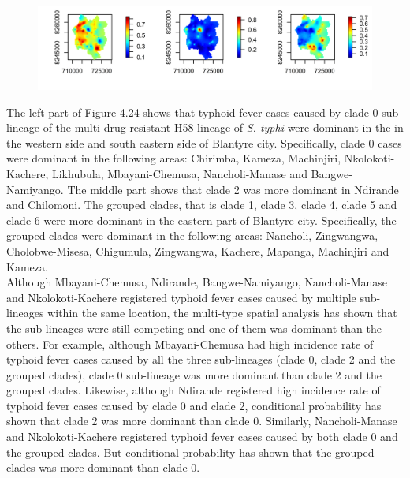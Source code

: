 \documentclass[12pt,a4paper]{report}
\begin{document}
\begin{figure}[H]
\begin{center}
\includegraphics[width=\linewidth]{Conditional probability - Multi-type.png}
\end{center}
\end{figure}

The left part of Figure 4.24 shows that typhoid fever cases caused by clade 0 sub-lineage of the multi-drug resistant H58 lineage of \textit{S. typhi} were dominant in the in the western side and south eastern side of Blantyre city. Specifically, clade 0 cases were dominant in the following areas: Chirimba, Kameza, Machinjiri, Nkolokoti-Kachere, Likhubula, Mbayani-Chemusa, Nancholi-Manase and Bangwe-Namiyango. The middle part shows that clade 2 was more dominant in Ndirande and Chilomoni. The grouped clades, that is clade 1, clade 3, clade 4, clade 5 and clade 6 were more dominant in the eastern part of Blantyre city. Specifically, the grouped clades were dominant in the following areas: Nancholi, Zingwangwa, Cholobwe-Misesa, Chigumula, Zingwangwa, Kachere, Mapanga, Machinjiri and Kameza.\\

Although Mbayani-Chemusa, Ndirande, Bangwe-Namiyango,  Nancholi-Manase and Nkolokoti-Kachere registered typhoid fever cases caused by multiple sub-lineages within the same location, the multi-type spatial analysis has shown that the sub-lineages were still competing and one of them was dominant than the others. For example, although Mbayani-Chemusa had high incidence rate of typhoid fever cases caused by all the three sub-lineages (clade 0, clade 2 and the grouped clades), clade 0 sub-lineage was more dominant than clade 2 and the grouped clades. Likewise, although Ndirande registered high incidence rate of typhoid fever cases caused by clade 0 and clade 2, conditional probability has shown that clade 2 was more dominant than clade 0. Similarly, Nancholi-Manase and Nkolokoti-Kachere registered typhoid fever cases caused by both clade 0 and the grouped clades. But conditional probability has shown that the grouped clades was more dominant than clade 0.
\end{document}
